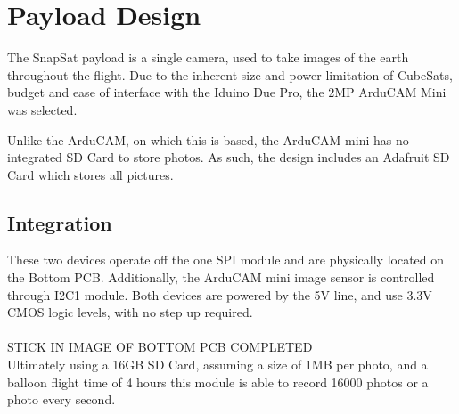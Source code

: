 \section{Payload Design}

The SnapSat payload is a single camera, used to take images of the earth throughout the flight.
Due to the inherent size and power limitation of CubeSats, budget and ease of interface with the Iduino Due Pro, the 2MP ArduCAM Mini was selected. \\

\begin{figure}[H]
    \label{fig:arducam}
\end{figure}

Unlike the ArduCAM, on which this is based, the ArduCAM mini has no integrated SD Card to store photos.  As such, the design includes an Adafruit SD Card which stores all pictures.

\begin{figure}[H]
    \label{fig:sdcard}
\end{figure}

\subsection{Integration}

These two devices operate off the one SPI module and are physically located on the Bottom PCB.  Additionally, the ArduCAM mini image sensor is controlled through I2C1 module.  Both devices are powered by the 5V line, and use 3.3V CMOS logic levels, with no step up required. \\ \\

STICK IN IMAGE OF BOTTOM PCB COMPLETED \\

Ultimately using a 16GB SD Card, assuming a size of 1MB per photo, and a balloon flight time of 4 hours this module is able to record 16000 photos or a photo every second.